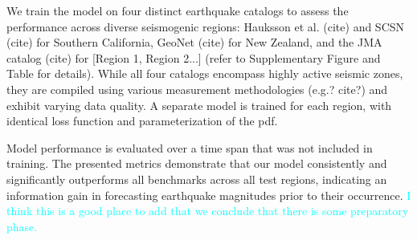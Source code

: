 \documentclass[pdflatex]{sn-jnl}
\newcommand{\neri}[1]{{\textcolor{cyan}{#1}}}
\begin{document}
We train the model on four distinct earthquake catalogs to assess the performance across diverse seismogenic regions: Hauksson et al. (cite) and SCSN (cite) for Southern California, GeoNet (cite) for New Zealand, and the JMA catalog (cite) for [Region 1, Region 2...] (refer to Supplementary Figure and Table for details). While all four catalogs encompass highly active seismic zones, they are compiled using various measurement methodologies (e.g.? cite?) and exhibit varying data quality. A separate model is trained for each region, with identical loss function and parameterization of the pdf. 

Model performance is evaluated over a time span that was not included in training. The presented metrics demonstrate that our model consistently and significantly outperforms all benchmarks across all test regions, indicating an information gain in forecasting earthquake magnitudes prior to their occurrence. \neri{I think this is a good place to add that we conclude that there is some preparatory phase.}
\end{document}
